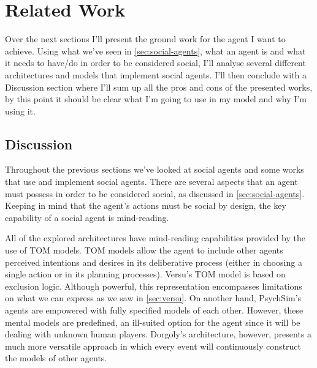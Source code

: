 \section{Related Work}
\label{sec:related-work}
Over the next sections I'll present the ground work for the agent I want to achieve.
Using what we've seen in \ref{sec:social-agents}, what an agent is and what it needs to have/do in order to be considered social, I'll analyse several different architectures and models that implement social agents.
I'll then conclude with a Discussion section where I'll sum up all the pros and cons of the presented works, by this point it should be clear what I'm going to use in my model and why I'm using it.






%

\subsection{Discussion}
Throughout the previous sections we've looked at social agents and some works that use and implement social agents.
There are several aspects that an agent must possess in order to be considered social, as discussed in \ref{sec:social-agents}.
Keeping in mind that the agent's actions must be social by design, the key capability of a social agent is mind-reading.

All of the explored architectures have mind-reading capabilities provided by the use of \ac{TOM} models.
\ac{TOM} models allow the agent to include other agents perceived intentions and desires in its deliberative process (either in choosing a single action or in its planning processes).
Versu's \ac{TOM} model is based on exclusion logic.
Although powerful, this representation encompasses limitations on what we can express as we saw in \ref{sec:versu}.
On another hand, PsychSim's agents are empowered with fully specified models of each other.
However, these mental models are predefined, an ill-suited option for the agent since it will be dealing with unknown human players.
Dorgoly's architecture, however, presents a much more versatile approach in which every event will continuously construct the models of other agents.

